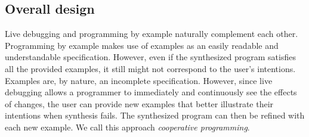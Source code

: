 \subsection{Overall design}
Live debugging and programming by example naturally complement each other.
Programming by example makes use of examples as an easily readable and understandable specification. However, even if the synthesized program satisfies all the provided examples, it still might not correspond to the user's intentions. Examples are, by nature, an incomplete specification. However, since live debugging allows a programmer to immediately and continuously see the effects of changes, the user can provide new examples that better illustrate their intentions when synthesis fails. The synthesized program can then be refined with each new example. We call this approach {\emph{cooperative programming}}.
